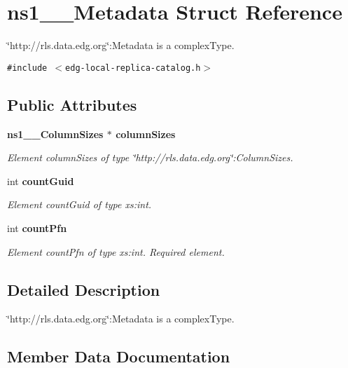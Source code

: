 \section{ns1\_\-\_\-Metadata Struct Reference}
\label{structns1____Metadata}
\char`\"{}http://rls.data.edg.org\char`\"{}:Metadata is a complex\-Type.  


{\tt \#include $<$edg-local-replica-catalog.h$>$}

\subsection*{Public Attributes}
\begin{CompactItemize}
\item 
\bf{ns1\_\-\_\-Column\-Sizes} $\ast$ \bf{column\-Sizes}
\begin{CompactList}\small\item\em Element column\-Sizes of type \char`\"{}http://rls.data.edg.org\char`\"{}:Column\-Sizes. \item\end{CompactList}\item 
int \bf{count\-Guid}
\begin{CompactList}\small\item\em Element count\-Guid of type xs:int. \item\end{CompactList}\item 
int \bf{count\-Pfn}\label{structns1____Metadata_a8715dcbdd5964ee58bc89c79cc00964}

\begin{CompactList}\small\item\em Element count\-Pfn of type xs:int. Required element. \item\end{CompactList}\end{CompactItemize}


\subsection{Detailed Description}
\char`\"{}http://rls.data.edg.org\char`\"{}:Metadata is a complex\-Type. 



\subsection{Member Data Documentation}
